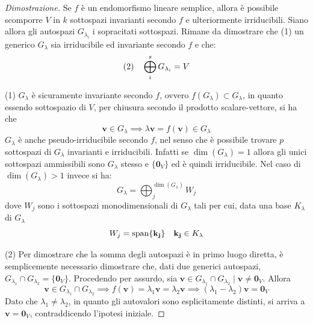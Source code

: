\documentclass{article}
\begin{document}
    \begin{proof}[Dimostrazione]
        Se $f$ è un endomorfismo lineare semplice, allora è possibile scomporre $V$ in $k$ sottospazi invarianti secondo $f$ e ulteriormente irriducibili. Siano allora gli autospazi $G_{\lambda_i}$ i sopracitati sottospazi. Rimane da dimostrare che (1) un generico $G_{\lambda}$ sia irriducibile ed invariante secondo $f$ e che:
        \[
            \textnormal{(2)} \quad \bigoplus_{i}^{s} G_{\lambda_i} = V
        \]

        \vspace{10pt}
        (1) 
        $G_{\lambda}$ è sicuramente invariante secondo $f$, ovvero $f(G_{\lambda}) \subset G_{\lambda}$, in quanto essendo sottospazio di $V$, per chiusura secondo il prodotto scalare-vettore, si ha che
        \[
            \mathbf{v} \in G_{\lambda} \implies \lambda \mathbf{v} = f(\mathbf{v}) \in G_{\lambda} 
        \]
        $G_{\lambda}$ è anche pseudo-irriducibile secondo $f$, nel senso che è possibile trovare $p$ sottospazi di $G_{\lambda}$ invarianti e irriducibili. Infatti se $\dim(G_{\lambda}) = 1$ allora gli unici sottospazi ammissibili sono $G_{\lambda}$ stesso e $\{ \mathbf{0}_V \}$ ed è quindi irriducibile. 
        Nel caso di $\dim(G_{\lambda}) > 1$ invece si ha:
        \[
            G_{\lambda} = \bigoplus_{j}^{\dim(G_{\lambda})} W_j
        \] 
        dove $W_j$ sono i sottospazi monodimensionali di $G_{\lambda}$ tali per cui, data una base $K_{\lambda}$ di $G_{\lambda}$ 
        \[
            W_j = \textnormal{span}\{ \mathbf{k_j} \} \quad \mathbf{k_j} \in K_{\lambda}
        \] 

        \vspace{10pt}
        (2)
        Per dimostrare che la somma degli autospazi è in primo luogo diretta, è semplicemente necessario dimostrare che, dati due generici autospazi, $G_{\lambda_1} \cap G_{\lambda_2} = \{ \mathbf{0}_V \}$.
        Procedendo per assurdo, sia $\mathbf{v} \in G_{\lambda_1} \cap G_{\lambda_2} \; | \; \mathbf{v} \neq \mathbf{0}_V$. Allora 
        \[
           \mathbf{v} \in G_{\lambda_1} \cap G_{\lambda_2} \implies f(\mathbf{v}) = \lambda_1 \mathbf{v} = \lambda_2 \mathbf{v} \implies (\lambda_1 - \lambda_2) \mathbf{v} = \mathbf{0}_V
        \]
        Dato che $\lambda_1 \neq \lambda_2$, in quanto gli autovalori sono esplicitamente distinti, si arriva a $\mathbf{v} = \mathbf{0}_V$, contraddicendo l'ipotesi iniziale.
        

\end{proof}
\end{document}
